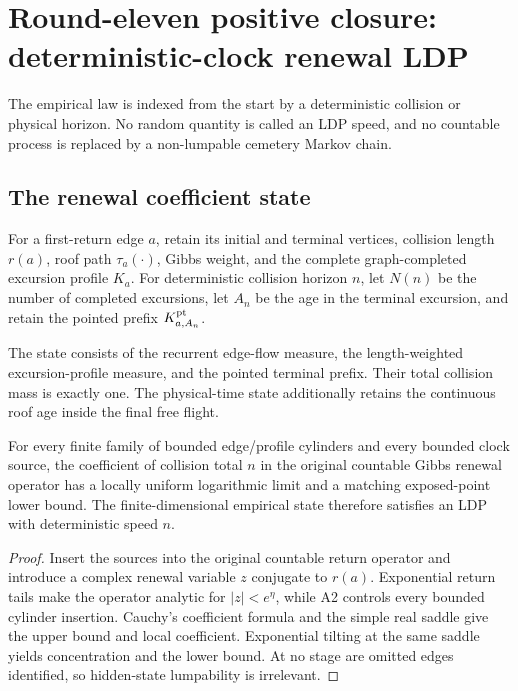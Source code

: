 \section{Round-eleven positive closure: deterministic-clock renewal LDP}
\label{sec:r11-a3}

The empirical law is indexed from the start by a deterministic collision or
physical horizon.  No random quantity is called an LDP speed, and no
countable process is replaced by a non-lumpable cemetery Markov chain.

\subsection{The renewal coefficient state}
For a first-return edge $a$, retain its initial and terminal vertices,
collision length $r(a)$, roof path $\tau_a(\cdot)$, Gibbs weight, and the
complete graph-completed excursion profile $K_a$.  For deterministic collision
horizon $n$, let $N(n)$ be the number of completed excursions, let $A_n$ be
the age in the terminal excursion, and retain the pointed prefix
$K^{\rm pt}_{a,A_n}$.

\begin{definition}
\label{def:r11-a3-state}
The state consists of the recurrent edge-flow measure, the length-weighted
excursion-profile measure, and the pointed terminal prefix.  Their total
collision mass is exactly one.  The physical-time state additionally retains
the continuous roof age inside the final free flight.
\end{definition}

\begin{theorem}
\label{thm:r11-a3-finite}
For every finite family of bounded edge/profile cylinders and every bounded
clock source, the coefficient of collision total $n$ in the original
countable Gibbs renewal operator has a locally uniform logarithmic limit and a
matching exposed-point lower bound.  The finite-dimensional empirical state
therefore satisfies an LDP with deterministic speed $n$.
\end{theorem}

\begin{proof}
Insert the sources into the original countable return operator and introduce a
complex renewal variable $z$ conjugate to $r(a)$.  Exponential return tails
make the operator analytic for $|z|<e^\eta$, while A2 controls every bounded
cylinder insertion.  Cauchy's coefficient formula and the simple real saddle
give the upper bound and local coefficient.  Exponential tilting at the same
saddle yields concentration and the lower bound.  At no stage are omitted
edges identified, so hidden-state lumpability is irrelevant.
\end{proof}

